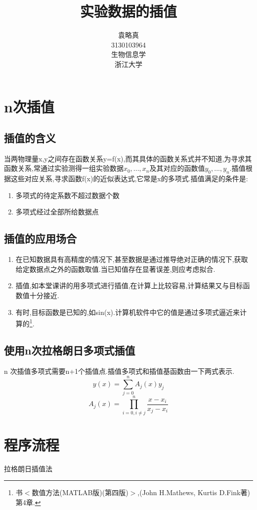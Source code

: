 \documentclass[10pt,a4paper]{article}
\title{实验数据的插值}
\author{袁略真\\3130103964\\生物信息学\\浙江大学}
\begin{document}
\maketitle
\section{n次插值}
\subsection{插值的含义}
当两物理量x,y之间存在函数关系y=f(x),而其具体的函数关系式并不知道,为寻求其函数关系,常通过实验测得一组实验数据$x_0,...,x_n$及其对应的函数值$y_0,...,y_n$.插值根据这些对应关系,寻求函数f(x)的近似表达式,它常是x的多项式.插值满足的条件是:
\begin{enumerate}
\item 多项式的待定系数不超过数据个数
\item 多项式经过全部所给数据点
\end{enumerate}
\subsection{插值的应用场合}
\begin{enumerate}
\item 在已知数据具有高精度的情况下,甚至数据是通过推导绝对正确的情况下,获取给定数据点之外的函数取值.当已知值存在显著误差,则应考虑拟合.

\item 插值,如本堂课讲的用多项式进行插值,在计算上比较容易,计算结果又与目标函数值十分接近.

\item 有时,目标函数是已知的,如sin(x).计算机软件中它的值是通过多项式逼近来计算的\footnote{书$<$数值方法(MATLAB版)(第四版)$>$,(John H.Mathews, Kurtis D.Fink著)第4章.}.
\end{enumerate}

\subsection{使用n次拉格朗日多项式插值}
n 次插值多项式需要n+1个插值点.插值多项式和插值基函数由一下两式表示.
$$y(x)=\sum\limits_{j=0}^n A_j (x) y_j$$
$$A_j (x) = \prod\limits_{i=0,i\neq j}^n \frac{x-x_i}{x_j-x_i}$$

\section{程序流程}
\begin{algorithm}[H]

 \caption{拉格朗日插值法}
\end{algorithm}
\end{document}
